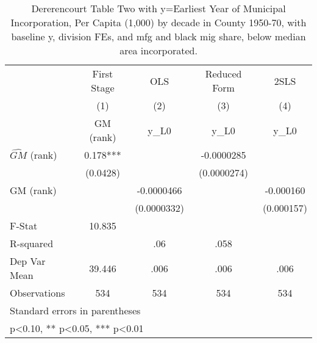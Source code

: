 \begin{table}[htbp]\centering
\def\sym#1{\ifmmode^{#1}\else\(^{#1}\)\fi}
\caption{Dererencourt Table Two with y=Earliest Year of Municipal Incorporation, Per Capita (1,000) by decade in County 1950-70, with baseline y, division FEs, and mfg and black mig share, below median area incorporated.}
\begin{tabular}{l*{4}{c}}
\toprule
                    & First Stage   &         OLS   &Reduced Form   &        2SLS   \\
                    &\multicolumn{1}{c}{(1)}&\multicolumn{1}{c}{(2)}&\multicolumn{1}{c}{(3)}&\multicolumn{1}{c}{(4)}\\
                    &\multicolumn{1}{c}{GM  (rank)}&\multicolumn{1}{c}{y\_L0}&\multicolumn{1}{c}{y\_L0}&\multicolumn{1}{c}{y\_L0}\\
\midrule
$\hat{GM}$ (rank)   &       0.178***&               &  -0.0000285   &               \\
                    &    (0.0428)   &               & (0.0000274)   &               \\
\addlinespace
GM  (rank)          &               &  -0.0000466   &               &   -0.000160   \\
                    &               & (0.0000332)   &               &  (0.000157)   \\
\midrule
F-Stat              &      10.835   &               &               &               \\
R-squared           &               &         .06   &        .058   &               \\
Dep Var Mean        &      39.446   &        .006   &        .006   &        .006   \\
Observations        &         534   &         534   &         534   &         534   \\
\bottomrule
\multicolumn{5}{l}{\footnotesize Standard errors in parentheses}\\
\multicolumn{5}{l}{\footnotesize * p<0.10, ** p<0.05, *** p<0.01}\\
\end{tabular}
\end{table}
